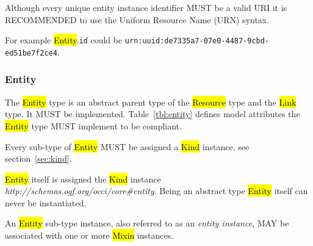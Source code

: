 \documentclass[10pt,a4paper]{article}
\begin{document}
Although every unique entity instance identifier MUST be a valid URI it is
RECOMMENDED to use the Uniform Resource Name (URN) \cite{rfc2141} syntax.

For example \hl{Entity}.{\tt id} could be
{\tt urn:uuid:de7335a7-07e0-4487-9cbd-ed51be7f2ce4}.

\subsubsection{Entity}
\label{sec:entity}
The \hl{Entity} type is an abstract parent type of the \hl{Resource} type and
the \hl{Link} type. It MUST be implemented.
%
Table~\ref{tbl:entity} defines model attributes the \hl{Entity} type
MUST implement to be compliant.
%

Every sub-type of \hl{Entity} MUST be assigned a \hl{Kind} instance,
see section~\ref{sec:kind}.

%
\hl{Entity} itself is assigned the \hl{Kind} instance
\textit{http://schemas.ogf.org/occi/core\#entity}.
%
Being an abstract type \hl{Entity} itself can never be instantiated.

An \hl{Entity} sub-type instance, also referred to as an {\em entity instance},
MAY be associated with one or more \hl{Mixin} instances.
\end{document}

